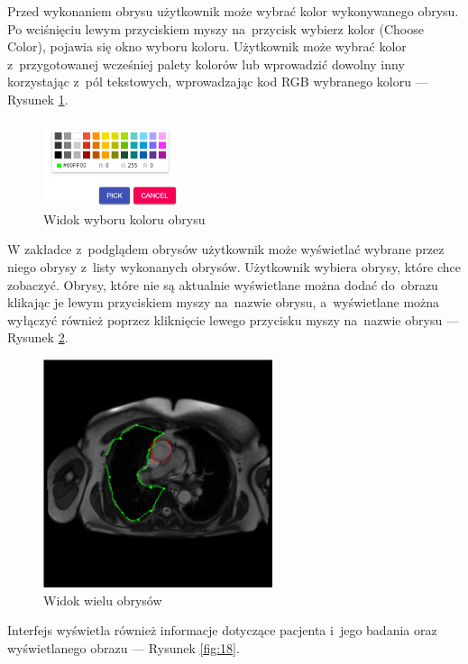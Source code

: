 \documentclass[a4paper,11pt,twoside,openright]{report}
\theoremstyle{definition}
\begin{document}
\pagebreak
Przed wykonaniem obrysu użytkownik może wybrać kolor wykonywanego obrysu.
Po wciśnięciu lewym przyciskiem myszy na~przycisk wybierz kolor (Choose Color),
pojawia się okno wyboru koloru. Użytkownik może wybrać kolor z~przygotowanej
wcześniej palety kolorów lub wprowadzić dowolny inny korzystając z~pól tekstowych,
wprowadzając kod RGB wybranego koloru --- Rysunek \ref{fig:16}.

\begin{figure}[h!]
	\center
	\includegraphics[width=0.35\textwidth]{16}
	\caption{Widok wyboru koloru obrysu}
    	\label{fig:16}
\end{figure}

W zakładce z~podglądem obrysów użytkownik może wyświetlać wybrane przez niego
obrysy z~listy wykonanych obrysów. Użytkownik wybiera obrysy, które chce zobaczyć.
Obrysy, które nie są aktualnie wyświetlane można dodać do~obrazu klikając je
lewym przyciskiem myszy na~nazwie obrysu, a~wyświetlane można wyłączyć również
poprzez kliknięcie lewego przycisku myszy na~nazwie obrysu --- Rysunek \ref{fig:17}.

\begin{figure}[h!]
	\center
	\includegraphics[width=0.6\textwidth]{17}
	\caption{Widok wielu obrysów}
    	\label{fig:17}
\end{figure}

\pagebreak

Interfejs wyświetla również informacje dotyczące pacjenta i~jego badania oraz
wyświetlanego obrazu --- Rysunek \ref{fig:18}.
\end{document}
